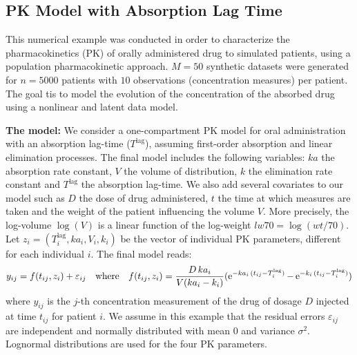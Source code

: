 \documentclass[11pt]{article}
\theoremstyle{t}
\begin{document}

\subsection{PK Model with Absorption Lag Time}
This numerical example was conducted in order to characterize the pharmacokinetics (PK) of orally administered drug to simulated patients, using a population pharmacokinetic approach. $M = 50$ synthetic datasets were generated for $n = 5000$ patients with $10$ observations (concentration measures) per patient.
The goal tis to model the evolution of the concentration of the absorbed drug using a nonlinear and latent data model. 

\textbf{The model:}
We consider a one-compartment PK model for oral administration with an absorption lag-time ($T^{\textrm{lag}}$), assuming first-order absorption and linear elimination processes.
The final model includes the following variables: $ka$ the absorption rate constant, $V$ the volume of distribution, $k$ the elimination rate constant and $T^{\textrm{lag}}$ the absorption lag-time. 
We also add several covariates to our model such as $D$ the dose of drug administered, $t$ the time at which measures are taken and the weight of the patient influencing the volume $V$. More precisely, the log-volume $\log(V)$ is a linear function of the log-weight $lw70= \log(wt/70)$.
Let $ z_i=(T_i^{\textrm{lag}}, ka_i, V_i, k_i)$ be the vector of individual PK parameters, different for each individual $i$.
The final model reads:
\begin{equation} \label{eq:pkmodel}
y_{ij} = f(t_{ij},z_i)+ \varepsilon_{ij} \quad \textrm{where} \quad f(t_{ij},z_i) = \frac{D\,ka_i}{V(ka_i - k_i)}(\operatorname{e}^{-ka_i\,(t_{ij} - T_i^{\textrm{lag}})}-\operatorname{e}^{-k_i\,(t_{ij} - T_i^{\textrm{lag}})})
\end{equation}
where $y_{ij}$ is the $j$-th concentration measurement of the drug of dosage $D$ injected at time $t_{ij}$ for patient $i$.
We assume in this example that the residual errors $\varepsilon_{ij}$ are independent and normally distributed with mean 0 and variance $\sigma^2$.
Lognormal distributions are used for the four PK parameters.
\end{document}
